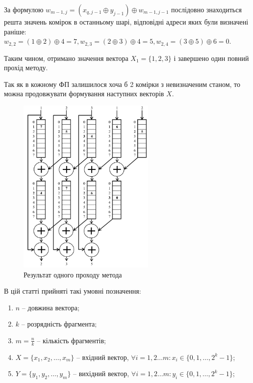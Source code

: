 \documentclass[12pt]{article}
\begin{document}
За формулою $w_{m-1,j}=(x_{q,j-1} \oplus y_{j-1}) \oplus w_{m-1,j-1}$ послідовно знаходиться решта значень комірок в останньому шарі, відповідні адреси яких були визначені раніше: $w_{2,2} = (1 \oplus 2) \oplus 4 = 7, w_{2,3} = (2 \oplus 3) \oplus 4 = 5, w_{2,4} = (3 \oplus 5) \oplus 6 = 0$.

Таким чином, отримано значення вектора $X_1=\{1,2,3\}$ і завершено один повний прохід методу.

Так як в кожному ФП залишилося хоча б 2 комірки з невизначеним станом, то можна продовжувати формування наступних векторів $X$.

\begin{figure}[h]
\centering
\includegraphics[width=0.6\textwidth]{ex1}
\caption{Результат одного проходу метода}
\label{fig:ex1}
\end{figure}

\newpage

В цій статті прийняті такі умовні позначення:
\begin{enumerate}
\item $n$ -- довжина вектора;
\item $k$ -- розрядність фрагмента;
\item $m = \frac{n}{k}$ -- кількість фрагментів;
\item $X = \{x_1, x_2, \dotsc , x_m\}$ -- вхідний вектор, $\forall i=1,2 \ldots m : x_i \in \{0,1, \ldots ,2^k-1\}$;
\item $Y = \{y_1, y_2, \dotsc , y_m\}$ -- вихідний вектор, $\forall i=1,2 \ldots m : y_i \in \{0,1, \ldots ,2^k-1\}$;
\end{enumerate}
\end{document}
